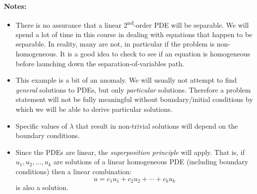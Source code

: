 \noindent\textbf{Notes:}  
\begin{itemize}
\item There is no assurance that a linear 2\textsuperscript{nd}-order PDE will be separable.  We will spend a lot of time in this course in dealing with equations that happen to be separable.  In reality, many are not, in particular if the problem is non-homogeneous.  It is a good idea to check to see if an equation is homogeneous before launching down the separation-of-variables path.

\item This example is a bit of an anomaly.  We will usually not attempt to find \emph{general} solutions to PDEs, but only \emph{particular} solutions.  Therefore a problem statement will not be fully meaningful without boundary/initial conditions by which we will be able to derive particular solutions.

\item Specific values of $\lambda$ that result in non-trivial solutions will depend on the boundary conditions.

\item Since the PDEs are linear, the \emph{superposition principle} will apply.  That is, if $u_1,u_2,\dots,u_k$ are solutions of a linear homogeneous PDE (including boundary conditions) then a linear combination:
\begin{equation*}
u = c_1 u_1 + c_2 u_2 + \cdots + c_k u_k
\end{equation*}
is also a solution.
\end{itemize}

